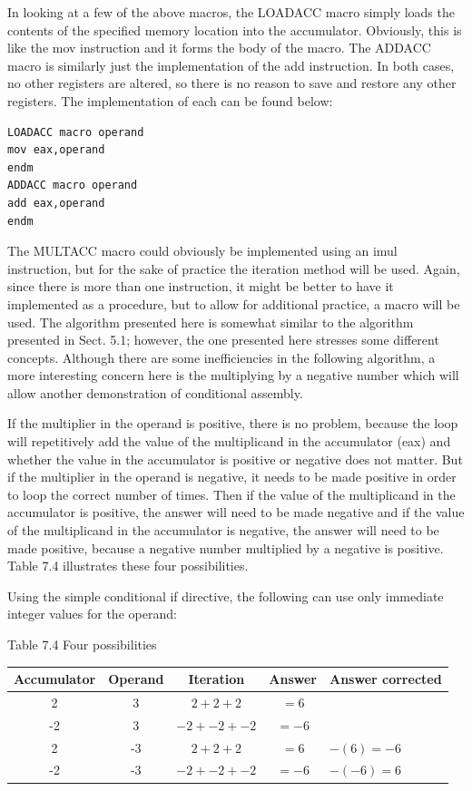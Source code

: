 \documentclass[10pt]{book}
\begin{document}
\begin{center}
\begin{center}
In looking at a few of the above macros, the LOADACC macro simply loads the contents of the specified memory location into the accumulator. Obviously, this is like the mov instruction and it forms the body of the macro. The ADDACC macro is similarly just the implementation of the add instruction. In both cases, no other registers are altered, so there is no reason to save and restore any other registers. The implementation of each can be found below:

\begin{verbatim}
LOADACC macro operand
mov eax,operand
endm
ADDACC macro operand
add eax,operand
endm
\end{verbatim}

The MULTACC macro could obviously be implemented using an imul instruction, but for the sake of practice the iteration method will be used. Again, since there is more than one instruction, it might be better to have it implemented as a procedure, but to allow for additional practice, a macro will be used. The algorithm presented here is somewhat similar to the algorithm presented in Sect. 5.1; however, the one presented here stresses some different concepts. Although there are some inefficiencies in the following algorithm, a more interesting concern here is the multiplying by a negative number which will allow another demonstration of conditional assembly.

If the multiplier in the operand is positive, there is no problem, because the loop will repetitively add the value of the multiplicand in the accumulator (eax) and whether the value in the accumulator is positive or negative does not matter. But if the multiplier in the operand is negative, it needs to be made positive in order to loop the correct number of times. Then if the value of the multiplicand in the accumulator is positive, the answer will need to be made negative and if the value of the multiplicand in the accumulator is negative, the answer will need to be made positive, because a negative number multiplied by a negative is positive. Table 7.4 illustrates these four possibilities.

Using the simple conditional if directive, the following can use only immediate integer values for the operand:

Table 7.4 Four possibilities

\begin{center}
\begin{tabular}{|ccccl|}
\hline
Accumulator & Operand & Iteration & Answer & Answer corrected \\
\hline
2 & 3 & $2+2+2$ & $=6$ &  \\
\hline
-2 & 3 & $-2+-2+-2$ & $=-6$ &  \\
2 & -3 & $2+2+2$ & $=6$ & $-(6)=-6$ \\
-2 & -3 & $-2+-2+-2$ & $=-6$ & $-(-6)=6$ \\
\hline
\end{tabular}
\end{center}


\end{center}
\end{center}
\end{document}
